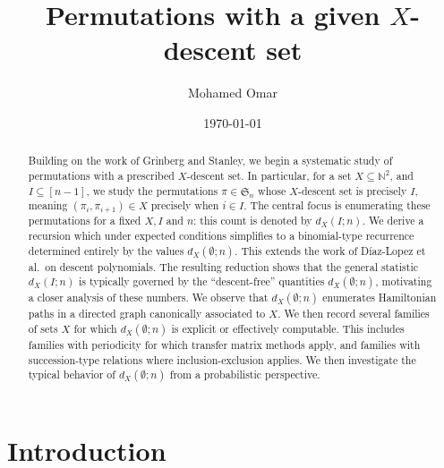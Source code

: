 \documentclass[12pt]{amsart}
\theoremstyle{definition}
\theoremstyle{remark}
\begin{document}
\title{Permutations with a given $X$-descent set}
\author{Mohamed Omar}
\address{Department of Mathematics \& Statistics. York University. 4700 Keele St. Toronto, Canada. M3J 1P3}


\begin{abstract}
Building on the work of Grinberg and Stanley, we begin a systematic study of permutations with a prescribed $X$-descent set. In particular, for a set $X \subseteq \mathbb{N}^2$, and $I \subseteq [n-1]$, we study the permutations $\pi \in \mathfrak{S}_n$ whose $X$-descent set is precisely $I$, meaning $(\pi_i,\pi_{i+1}) \in X$ precisely when $i \in I$. The central focus is enumerating these permutations for a fixed $X,I$ and $n$: this count is denoted by $d_X(I;n)$. We derive a recursion which under expected conditions simplifies to a binomial-type recurrence determined entirely by the values $d_X(\emptyset;n)$.
This extends the work of D\'iaz-Lopez et al.\ on descent polynomials.
The resulting reduction shows that the general statistic $d_X(I;n)$ is typically governed by the ``descent-free'' quantities $d_X(\emptyset;n)$, motivating a closer analysis of these numbers.
We observe that $d_X(\emptyset;n)$ enumerates Hamiltonian paths in a directed graph canonically associated to $X$. We then record several families of sets $X$ for which $d_X(\emptyset;n)$ is explicit or effectively computable. This includes families with periodicity for which transfer matrix methods apply, and families with succession-type relations where inclusion-exclusion applies. We then investigate the typical behavior of $d_X(\emptyset;n)$ from a probabilistic perspective.
\end{abstract}


\maketitle
\date{\today}


%
\section{Introduction}
\end{document}
